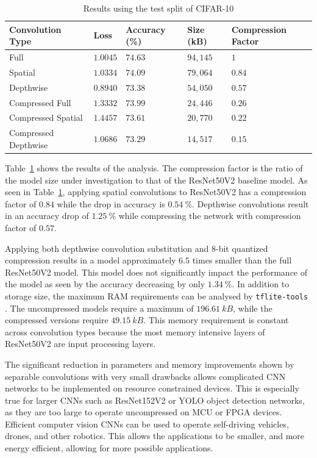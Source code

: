 \documentclass{article}
\begin{document}
	\begin{table}[b!]
		\caption{Results using the test split of CIFAR-10}
		\label{tbl:results}
		\centering
		\begin{tabular}{lllll}
			\toprule
			Convolution Type     & Loss     & Accuracy (\%)    & Size (kB) & Compression Factor \\ \midrule
			Full                 & $1.0045$ & $74.63$          & $94,145$  & $1$                \\
			Spatial              & $1.0334$ & $74.09$          & $79,064$  & $0.84$             \\
			Depthwise            & $0.8940$ & $73.38$          & $54,050$  & $0.57$             \\
			Compressed Full      & $1.3332$ & $73.99$          & $24,446$  & $0.26$             \\
			Compressed Spatial   & $1.4457$ & $73.61$          & $20,770$  & $0.22$             \\
			Compressed Depthwise & $1.0686$ & $\mathbf{73.29}$ & $14,517$  & $\mathbf{0.15}$    \\ \bottomrule
		\end{tabular}
	\end{table}

	Table~\ref{tbl:results} shows the results of the analysis. The compression factor is the ratio of the model size under investigation to that of the ResNet50V2 baseline model. As seen in Table~\ref{tbl:results}, applying spatial convolutions to ResNet50V2 has a compression factor of $0.84$ while the drop in accuracy is $0.54~\%$. Depthwise convolutions result in an accuracy drop of $1.25~\%$ while compressing the network with compression factor of $0.57$.
	
	Applying both depthwise convolution substitution and 8-bit quantized compression results in a model approximately $6.5$ times smaller than the full ResNet50V2 model. This model does not significantly impact the performance of the model as seen by the accuracy decreasing by only $1.34~\%$. In addition to storage size, the maximum RAM requirements can be analysed by \verb|tflite-tools| \cite{tflietools}. The uncompressed models require a maximum of $196.61~kB$, while the compressed versions require $49.15~kB$. This memory requirement is constant across convolution types because the most memory intensive layers of ResNet50V2 are input processing layers.
	
	The significant reduction in parameters and memory improvements shown by separable convolutions with very small drawbacks allows complicated CNN networks to be implemented on resource constrained devices. This is especially true for larger CNNs such as ResNet152V2 or YOLO object detection networks, as they are too large to operate uncompressed on MCU or FPGA devices. Efficient computer vision CNNs can be used to operate self-driving vehicles, drones, and other robotics. This allows the applications to be smaller, and more energy efficient, allowing for more possible applications. 
	
\end{document}
